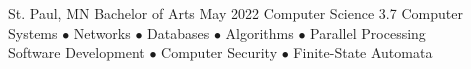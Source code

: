 \documentclass[12pt,letterpaper]{article}
\begin{document}
{\address{1600 Grand Ave, Saint Paul, MN 55105}}
{}
{}
{}
{}
{}

\begin{educationsection}
    {St. Paul, MN}
    {Bachelor of Arts}
    {May 2022}
    {Computer Science}
    {3.7}
    {Computer Systems $\bullet$ Networks $\bullet$ Databases $\bullet$ Algorithms $\bullet$ Parallel Processing\\
        Software Development $\bullet$ Computer Security $\bullet$ Finite-State Automata}
\end{educationsection}

\end{document}

